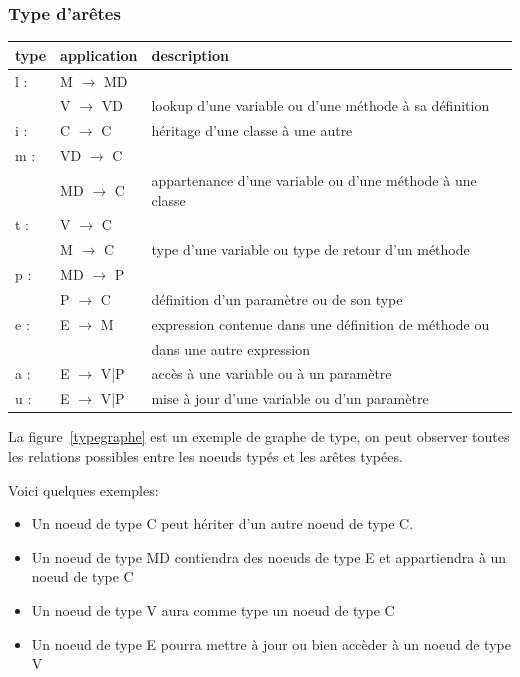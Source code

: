 \documentclass[a4paper, 12pt]{article}
\begin{document}
  \subsubsection{Type d'arêtes}
  \begin{tabular}{ | l | l |  l |}
    \hline type & application & description  \\ \hline
    l : & M $\rightarrow$ MD & \\ & V $\rightarrow$ VD & lookup d'une variable ou d'une méthode à sa définition \\ \hline
    i : & C $\rightarrow$ C &  héritage d'une classe à une autre  \\ \hline
    m : & VD $\rightarrow$ C & \\ & MD $\rightarrow$ C & appartenance d'une variable ou d'une méthode à une classe  \\ \hline
    t : & V $\rightarrow$ C  & \\ &  M $\rightarrow$ C & type d'une variable ou type de retour d'un méthode   \\ \hline
    p : & MD $\rightarrow$ P  & \\ &  P $\rightarrow$ C & définition d'un paramètre ou de son type     \\ \hline
    e : & E $\rightarrow$ M & expression contenue dans une définition de méthode ou \\ & &  dans une autre expression    \\ \hline
    a : & E $\rightarrow$ {V|P} & accès à une variable ou à un paramètre    \\ \hline
    u : & E $\rightarrow$ {V|P} & mise à jour d'une variable ou d'un paramètre    \\ \hline
  \end{tabular}

  La figure~\ref{typegraphe} est un exemple de graphe de type, on peut observer toutes les relations possibles entre les noeuds typés et les arêtes typées.

  Voici quelques exemples:
  \begin{itemize}[label=\textbullet]
    \item Un noeud de type C peut hériter d'un autre noeud de type C.
    \item Un noeud de type MD contiendra des noeuds de type E et appartiendra à un noeud de type C
    \item Un noeud de type V aura comme type un noeud de type C
    \item Un noeud de type E pourra mettre à jour ou bien accèder à un noeud de type V
  \end{itemize}
\end{document}
